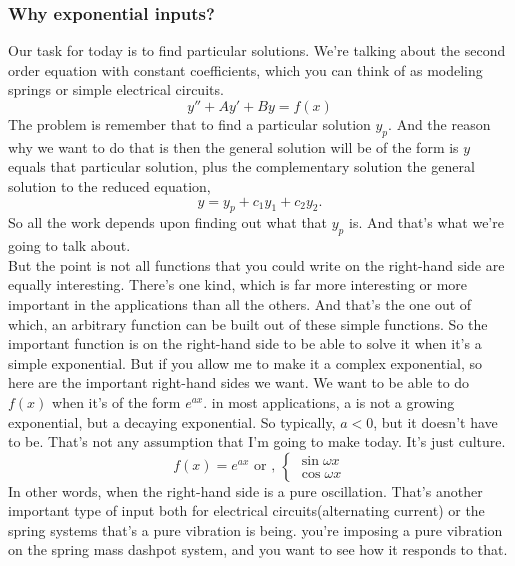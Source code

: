 \subsubsection{Why exponential inputs?}
Our task for today is to find particular solutions.
We're talking about the second order equation with constant coefficients,
which you can think of as modeling springs or simple electrical circuits.
\begin{equation*}
  y'' + Ay' + By = f(x)
\end{equation*}
The problem is remember that to find a particular solution $y_p$. 
And the reason why we want to do that is then the general solution will be
of the form is $y$ equals that particular solution, plus the complementary solution
the general solution to the reduced equation,
\begin{equation*}
  y = y_p + c_1 y_1 + c_2 y_2. 
\end{equation*}
So all the work depends upon finding out what that $y_p$ is.
And that's what we're going to talk about. \\

But the point is not all functions that you could write on the right-hand side are equally interesting.
There's one kind, which is far more interesting or more important in the applications than all the others.
And that's the one out of which, an arbitrary function can be built out of these simple functions.
So the important function is on the right-hand side to be able to solve it when it's a simple exponential.
But if you allow me to make it a complex exponential, so here are the important right-hand sides we want.
We want to be able to do $f(x)$ when it's of the form $e^{ax}$.
in most applications, a is not a growing exponential, but a decaying exponential.
So typically, $a < 0$, but it doesn't have to be.
That's not any assumption that I'm going to make today. It's just culture.
\begin{equation*}
   f(x) = e^{ax} \text{ or , } \left\{
    \begin{array}{rl}
      \sin \omega x \\
      \cos \omega x
    \end{array} \right. 
\end{equation*}
In other words, when the right-hand side is a pure oscillation.
That's another important type of input both for electrical circuits(alternating current) or the spring systems that's a pure vibration is being. 
you're imposing a pure vibration on the spring mass dashpot system, and you want to see how it responds to that. \\

